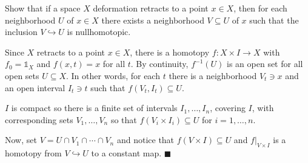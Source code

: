 \question Show that if a space $X$ deformation retracts to a point $x \in X$,
then for each neighborhood $U$ of $x \in X$ there exists a neighborhood $V
\subseteq U$ of $x$ such that the inclusion $V \hookrightarrow U$ is
nullhomotopic.


\begin{solution}
    Since $X$ retracts to a point $x \in X$, there is a homotopy $f: X \times I
    \rightarrow X$ with $f_0 = \mathbb{1}_X$ and $f(x,t) = x$ for all $t$. By
    continuity, $f^{-1}(U)$ is an open set for all open sets $U \subseteq X$. In
    other words, for each $t$ there is a neighborhood $V_t \ni x$ and an open
    interval $I_t \ni t$ such that $f(V_t, I_t) \subseteq U$.

    $I$ is compact so there is a finite set of intervals $I_1, \ldots, I_n$,
    covering $I$, with corresponding sets $V_1, \ldots, V_n$ so that $f(V_i
    \times I_i) \subseteq U$ for $i = 1, \ldots, n$. 

    Now, set $V = U \cap V_1 \cap \cdots \cap V_n$ and notice that $f(V \times
    I) \subseteq U$ and $f\rvert_{V \times I}$ is a homotopy from $V
    \hookrightarrow U$ to a constant map. \hfill $\blacksquare$
\end{solution}